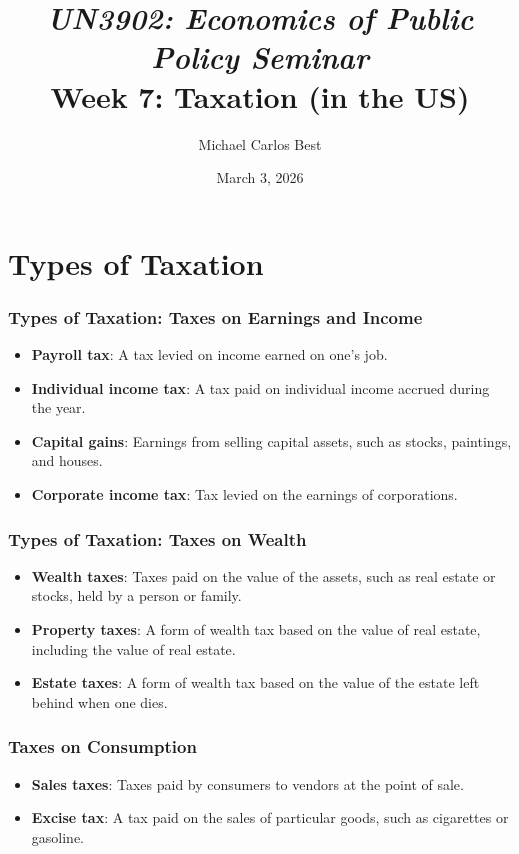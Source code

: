\documentclass[aspectratio=169]{beamer}
\newcommand\makebeamertitle{\frame{\maketitle}}%
\begin{document}
\title{\textit{UN3902: Economics of Public Policy Seminar} \\ Week 7: Taxation (in the US)}
\author{Michael Carlos Best}
\date{March 3, 2026}

\makebeamertitle

\section{Types of Taxation}

\begin{frame}
\frametitle{Types of Taxation: Taxes on Earnings and Income}
\begin{itemize}
  \setlength{\itemsep}{15pt} %
  \item \textbf{Payroll tax}: A tax levied on income earned on one's job.
  \item \textbf{Individual income tax}: A tax paid on individual income accrued during the year.
  \item \textbf{Capital gains}: Earnings from selling capital assets, such as stocks, paintings, and houses.
  \item \textbf{Corporate income tax}: Tax levied on the earnings of corporations.
\end{itemize}
\end{frame}

\begin{frame}
\frametitle{Types of Taxation: Taxes on Wealth}
\begin{itemize}
  \setlength{\itemsep}{15pt} %
  \item \textbf{Wealth taxes}: Taxes paid on the value of the assets, such as real estate or stocks, held by a person or family.
  \item \textbf{Property taxes}: A form of wealth tax based on the value of real estate, including the value of real estate.
  \item \textbf{Estate taxes}: A form of wealth tax based on the value of the estate left behind when one dies.
\end{itemize}
\end{frame}

\begin{frame}
\frametitle{Taxes on Consumption}
\begin{itemize}
  \setlength{\itemsep}{15pt} %
  \item \textbf{Sales taxes}: Taxes paid by consumers to vendors at the point of sale.
  \item \textbf{Excise tax}: A tax paid on the sales of particular goods, such as cigarettes or gasoline.
\end{itemize}
\end{frame}
\end{document}
